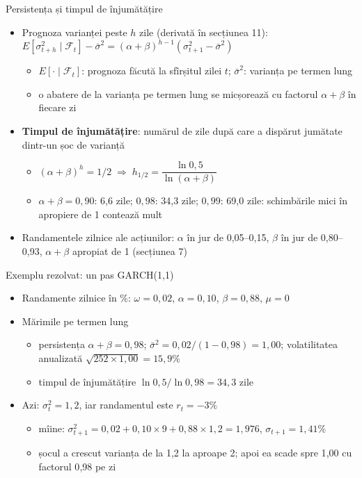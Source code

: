 \begin{frame}{Persistența și timpul de înjumătățire}
\itemsize{\small}
\begin{itemize}
    \item Prognoza varianței peste $h$ zile (derivată în secțiunea 11): $E[\sigma_{t+h}^2 \mid \mathcal{F}_t] - \bar\sigma^2 = (\alpha + \beta)^{h-1}(\sigma_{t+1}^2 - \bar\sigma^2)$
    \begin{itemize}
        \item $E[\cdot \mid \mathcal{F}_t]$: prognoza făcută la sfîrșitul zilei $t$; $\bar\sigma^2$: varianța pe termen lung
        \item o abatere de la varianța pe termen lung se micșorează cu factorul $\alpha + \beta$ în fiecare zi
    \end{itemize}
    \item \textbf{Timpul de înjumătățire}: numărul de zile după care a dispărut jumătate dintr-un șoc de varianță
    \begin{itemize}
        \item $(\alpha + \beta)^{h} = 1/2 \;\Rightarrow\; h_{1/2} = \dfrac{\ln 0{,}5}{\ln(\alpha + \beta)}$
        \item $\alpha + \beta = 0{,}90$: 6{,}6 zile; $0{,}98$: 34{,}3 zile; $0{,}99$: 69{,}0 zile: schimbările mici în apropiere de 1 contează mult
    \end{itemize}
    \item Randamentele zilnice ale acțiunilor: $\alpha$ în jur de 0,05--0,15, $\beta$ în jur de 0,80--0,93, $\alpha + \beta$ apropiat de 1 (secțiunea 7)
\end{itemize}
\end{frame}

\begin{frame}{Exemplu rezolvat: un pas GARCH(1,1)}
\itemsize{\small}
\begin{itemize}
    \item Randamente zilnice în \%: $\omega = 0{,}02$, $\alpha = 0{,}10$, $\beta = 0{,}88$, $\mu = 0$
    \item Mărimile pe termen lung
    \begin{itemize}
        \item persistența $\alpha + \beta = 0{,}98$; $\bar\sigma^2 = 0{,}02/(1 - 0{,}98) = 1{,}00$; volatilitatea anualizată $\sqrt{252 \times 1{,}00} = 15{,}9\%$
        \item timpul de înjumătățire $\ln 0{,}5/\ln 0{,}98 = 34{,}3$ zile
    \end{itemize}
    \item Azi: $\sigma_t^2 = 1{,}2$, iar randamentul este $r_t = -3\%$
    \begin{itemize}
        \item mîine: $\sigma_{t+1}^2 = 0{,}02 + 0{,}10 \times 9 + 0{,}88 \times 1{,}2 = 1{,}976$, $\sigma_{t+1} = 1{,}41\%$
        \item șocul a crescut varianța de la 1,2 la aproape 2; apoi ea scade spre 1{,}00 cu factorul 0{,}98 pe zi
    \end{itemize}
\end{itemize}
\end{frame}


